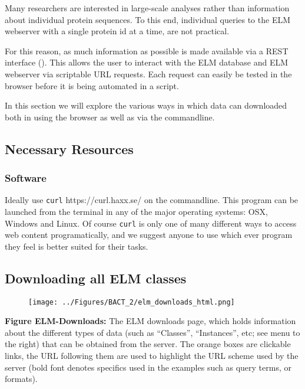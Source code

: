Many researchers are interested in large-scale analyses rather than
information about individual protein sequences. To this end, individual
queries to the ELM webserver with a single protein id at a time, are not
practical.

For this reason, as much information as possible is made available via a
REST interface (\cite{Fielding_2002}). This allows the user to interact
with the ELM database and ELM webserver via scriptable URL requests.
Each request can easily be tested in the browser before it is being
automated in a script.

In this section we will explore the various ways in which data can
downloaded both in using the browser as well as via the commandline.

\subsection{Necessary Resources}\label{necessary-resources-3}

\subsubsection{Software}\label{software-1}

Ideally use \texttt{curl} https://curl.haxx.se/ on the commandline. This
program can be launched from the terminal in any of the major operating
systems: OSX, Windows and Linux. Of course \texttt{curl} is only one of
many different ways to access web content programatically, and we
suggest anyone to use which ever program they feel is better suited for
their tasks.

\subsection{Downloading all ELM
classes}\label{downloading-all-elm-classes}

\begin{figure}[htbp]
\centering
\texttt{[image: ../Figures/BACT\_2/elm\_downloads\_html.png]}
\end{figure}

\textbf{Figure ELM-Downloads:} The ELM downloads page, which holds
information about the different types of data (such as ``Classes'',
``Instances'', etc; see menu to the right) that can be obtained from the
server. The orange boxes are clickable links, the URL following them are
used to highlight the URL scheme used by the server (bold font denotes
specifics used in the examples such as query terms, or formats).

